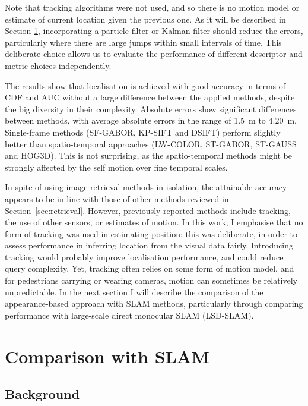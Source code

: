 Note that tracking algorithms were not used, and so there is no motion model or estimate of current location given the previous one. As it will be described in Section \ref{sec:slamcomp}, incorporating a particle filter or Kalman filter should reduce the errors, particularly where there are large jumps within small intervals of time. This deliberate choice allows us to evaluate the performance of different descriptor and metric choices independently.

The results show that localisation is achieved with good accuracy in terms of CDF and AUC without a large difference between the applied methods, despite the big diversity in their complexity. Absolute errors show significant differences between methods, with average absolute errors in the range of \SI{1.5}{m} to \SI{4.20}{m}. Single-frame methods (SF-GABOR, KP-SIFT and DSIFT) perform slightly better than spatio-temporal approaches (LW-COLOR, ST-GABOR, ST-GAUSS and HOG3D). This is not surprising, as the spatio-temporal methods might be strongly affected by the self motion over fine temporal scales.

In spite of using image retrieval methods in isolation, the attainable accuracy appears to be in line with those of  other methods reviewed in Section~\ref{sec:retrieval}.  However, previously reported methods include tracking, the use of other sensors, or estimates of motion. In this work, I emphasise that no form of tracking was used in estimating position: this was deliberate, in order to assess performance in inferring location from the visual data fairly.  Introducing tracking would probably improve localisation performance, and could reduce query complexity. Yet, tracking often relies on some form of motion model, and for pedestrians carrying or wearing cameras, motion can sometimes be relatively unpredictable. In the next section I will describe the comparison of the appearance-based approach with SLAM methods, particularly through comparing performance with large-scale direct monocular SLAM (LSD-SLAM).

\section{Comparison with SLAM}
\label{sec:slamcomp}


\subsection{Background}


